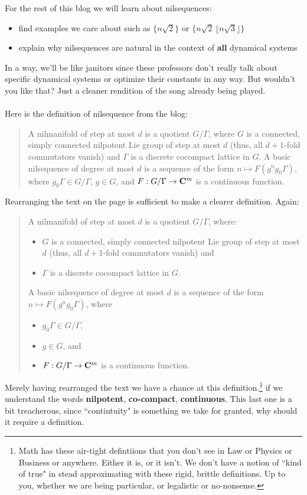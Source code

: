 \documentclass[12pt]{article}
\begin{document}
\noindent For the rest of this blog we will learn about nilsequences:
\begin{itemize}
\item find examples we care about such as $\{ n \sqrt{2}\}$ or $ \{ n \sqrt{2} \, \lfloor n \sqrt{3}\rfloor \} $
\item explain why nilsequences are natural in the context of \textbf{all} dynamical systems
\end{itemize}
In a way, we'll be like janitors since these professors don't really talk about specific dynamical systems or optimize their constants in any way.  But wouldn't you like that?  Just a cleaner rendition of the song already being played. \\ \\
Here is the definition of nilsequence from the blog:
\begin{quotation}
\noindent A nilmanifold of step at most ${d}$ is a quotient ${G/\Gamma}$, where ${G}$ is a connected, simply connected nilpotent Lie group of step at most ${d}$ (thus, all ${d+1}$-fold commutators vanish) and ${\Gamma}$ is a discrete cocompact lattice in ${G}$. A basic nilsequence of degree at most ${d}$ is a sequence of the form ${n \mapsto F(g^n g_0 \Gamma)}$, where ${g_0 \Gamma \in G/\Gamma}$, ${g \in G}$, and ${F: G/\Gamma \rightarrow {\bf C}^m}$ is a continuous function.
\end{quotation}
Rearranging the text on the page is sufficient to make a clearer definition.  Again:
\begin{quotation}
\noindent A nilmanifold of step at most ${d}$ is a quotient ${G/\Gamma}$, where:
\begin{itemize}
\item ${G}$ is a connected, simply connected nilpotent Lie group of step at most ${d}$ (thus, all ${d+1}$-fold commutators vanish) and 
\item ${\Gamma}$ is a discrete cocompact lattice in ${G}$.
\end{itemize}
A basic nilsequence of degree at most ${d}$ is a sequence of the form ${n \mapsto F(g^n g_0 \Gamma)}$, where 
\begin{itemize}
\item ${g_0 \Gamma \in G/\Gamma}$, 
\item ${g \in G}$, and 
\item ${F: G/\Gamma \rightarrow {\bf C}^m}$ is a continuous function.
\end{itemize}
\end{quotation}
Merely having rearranged the text we have a chance at this definition.\footnote{Math has these air-tight defintiions that you don't see in Law or Physics or Business or anywhere.  Either it is, or it isn't.  We don't have a notion of ``kind of true" in stead approximating with these rigid, brittle definitions.  Up to you, whether we are being particular, or legalistic or no-nonsense.} if we understand the words \textbf{nilpotent}, \textbf{co-compact}, \textbf{continuous}.  This last one is a bit treacherous, since ``contintuity" is something we take for granted, why should it require a definition.
\end{document}
